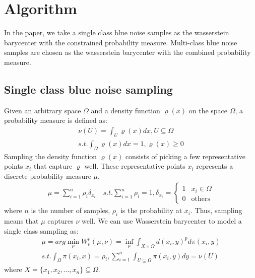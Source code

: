 \section{Algorithm}

In the paper,
we take a single class blue noise samples  as the wasserstein barycenter with the constrained probability measure.
Multi-class blue noise samples are chosen as the wasserstein barycenter with the combined probability measure.
\subsection{Single class blue noise sampling}
Given an arbitrary space $\Omega$ and a density function $\varrho(x)$ on the space $\Omega$,
a probability measure is defined as:
\begin{equation}\label{probability-measure}
  \begin{split}
  \nu(U)=\int_U\varrho(x)dx, U\subseteq\Omega \\
  s.t. \int_{\Omega}\varrho(x)dx=1,\varrho(x)\geq0
  \end{split}
\end{equation}
Sampling the density function $\varrho(x)$ consists of picking a few representative points $x_i$
that capture $\varrho$ well.
These representative points $x_i$ represents a discrete probability measure $\mu$,
\begin{equation*}
\begin{split}
  \mu=\sum\limits_{i=1}^n\rho_i\delta_{x_i} \quad
  s.t. \sum\limits_{i=1}^n\rho_i=1,  \delta_{x_i}= \left\{ \begin{array}{ll}
  1 & x_i\in\Omega\\
  0 & \textrm{others}
  \end{array} \right.
  \end{split}
\end{equation*}
where $n$ is the number of samples,
$\rho_i$ is the probability at $x_i$.
Thus,
sampling means that $\mu$ captures $\nu$ well.
We can use Wasserstein barycenter to model a single class sampling as:
\begin{equation}\label{single-class-problem}
\begin{split}
 \mu=arg\min\limits_\mu W_p^p(\mu,\nu)=\inf\limits_\mu\int_{X\times\Omega}d(x_i,y)^pd\pi(x_i,y)\\
 s.t. \int_\Omega\pi(x_i,x)=\rho_i, \sum\limits_{i=1}^n\int_{U\subseteq\Omega}\pi(x_i,y)dy=\nu(U)
 \end{split}
\end{equation}
where $X=\{x_1,x_2,...,x_n\}\subseteq\Omega$.

